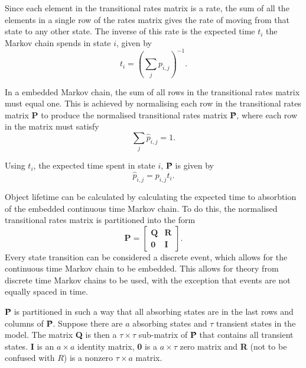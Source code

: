 Since each element in the transitional rates matrix is a rate, the sum of all the elements in a single row of the rates matrix gives the rate of moving from that state to any other state. The inverse of this rate is the expected time $t_i$ the Markov chain spends in state $i$, given by
%
\begin{equation} \label{eq_markov_rates}
    t_i = \left(\sum_{j} p_{i, j}\right)^{-1}.
\end{equation}

In a embedded Markov chain, the sum of all rows in the transitional rates matrix must equal one. This is achieved by normalising each row in the transitional rates matrix \textbf{P} to produce the normalised transitional rates matrix \textbf{\^{P}}, where each row in the matrix must satisfy
%
\begin{equation} \label{eq_markov_sum}
    \sum_{j} \hat{p}_{i, j} = 1.
\end{equation}

Using $t_i$, the expected time spent in state $i$, \textbf{\^{P}} is given by
%
\begin{equation} \label{eq_markov_normalisation}
    \hat{p}_{i, j} = p_{i, j} t_i.
\end{equation}

Object lifetime can be calculated by calculating the expected time to absorbtion of the embedded continuous time Markov chain. To do this, the normalised transitional rates matrix is partitioned into the form
%
\begin{equation} \label{matrix_partition}
    \textbf{\^{P}} = \left[\begin{array}{c|c}
                   \textbf{Q} & \textbf{R} \\
                   \hline
                   \textbf{0} & \textbf{I}
                 \end{array}\right].
\end{equation}
%
Every state transition can be considered a discrete event, which allows for the continuous time Markov chain to be embedded. This allows for theory from discrete time Markov chains to be used, with the exception that events are not equally spaced in time.

\textbf{\^{P}} is partitioned in such a way that all absorbing states are in the last rows and columns of \textbf{\^{P}}. Suppose there are $a$ absorbing states and $\tau$ transient states in the model. The matrix \textbf{Q} is then a $\tau\times\tau$ sub-matrix of \textbf{\^{P}} that contains all transient states. \textbf{I} is an $a \times a$ identity matrix, \textbf{0} is a $a\times\tau$ zero matrix and \textbf{R} (not to be confused with $R$) is a nonzero $\tau\times a$ matrix.

